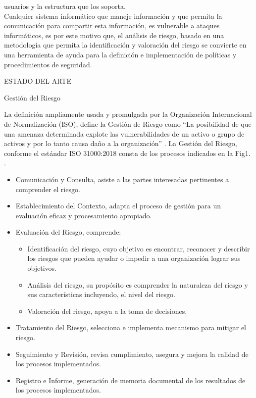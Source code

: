 \documentclass[a4paper,12pt]{article}
\begin{document}
usuarios y la estructura que los soporta.\\
Cualquier sistema informático que maneje información y que permita la comunicación 
para compartir esta información, es vulnerable a ataques informáticos, es por 
este motivo que, el análisis de riesgo, basado en una metodología que permita la identificación y valoración del riesgo se convierte en una herramienta 
de ayuda para la definición e implementación de políticas y procedimientos de 
seguridad.\\
\begin{bf}
\begin{center}
ESTADO DEL ARTE\\
\end{center}
\end{bf}
\begin{bf}   
Gestión del Riesgo\\
\end{bf}
\break
La definición ampliamente usada y promulgada por la Organización Internacional de 
Normalización (ISO), define la Gestión de Riesgo como “La posibilidad de que una 
amenaza determinada explote las vulnerabilidades de un activo o grupo de activos y 
por lo tanto causa daño a la organización” \cite{Institute2009}.
La Gestión del Riesgo, conforme el estándar ISO 31000:2018 consta de los procesos indicados en la 
Fig1. \cite{Grupo2018}.
\begin{itemize} 
\item Comunicación y Consulta, asiste a las partes interesadas pertinentes a comprender el 
riesgo. 
\item Establecimiento del Contexto, adapta el proceso de gestión para un evaluación 
eficaz y procesamiento apropiado. 
\item Evaluación del Riesgo, comprende:
\begin{itemize}
\item Identificación del riesgo, cuyo objetivo es encontrar, reconocer y describir los 
riesgos que pueden ayudar o impedir a una organización lograr sus objetivos. 
\item Análisis del riesgo, su propósito es comprender la naturaleza del riesgo y sus 
características incluyendo, el nivel del riesgo. 
\item Valoración del riesgo, apoya a la toma de decisiones.
\end{itemize} 
\item Tratamiento del Riesgo, selecciona e implementa mecanismo para mitigar el riesgo. 
\item Seguimiento y Revisión, revisa cumplimiento, asegura y mejora la calidad de los 
procesos implementados. 
\item Registro e Informe, generación de memoria documental de los resultados de los 
procesos implementados.
\end{itemize}
\end{document}
